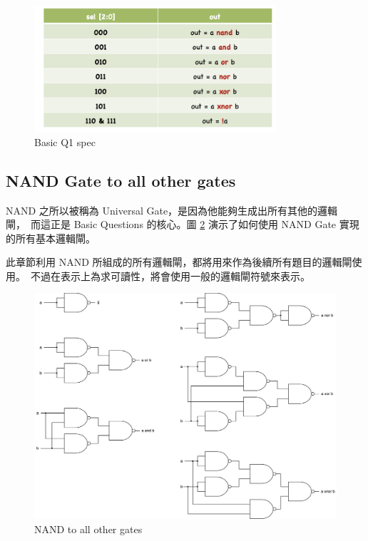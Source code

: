 \documentclass[10.5pt,compsoc,UTF8]{CjC}
\theoremstyle{mystyle}
\begin{document}
\begin{figure}[htp]
  \centering
  \includegraphics[width=0.8\textwidth]{Basic-Q1-spec.png}
  \caption{Basic Q1 spec}
  \label{fig:Basic Q1 spec}
\end{figure}
\subsection{NAND Gate to all other gates}

NAND 之所以被稱為 Universal Gate，是因為他能夠生成出所有其他的邏輯閘，\
而這正是 Basic Questions 的核心。圖 \ref{fig:NAND to all other gates} 演示了如何使用 NAND Gate 實現的所有基本邏輯閘。
\par
此章節利用 NAND 所組成的所有邏輯閘，都將用來作為後續所有題目的邏輯閘使用。\
不過在表示上為求可讀性，將會使用一般的邏輯閘符號來表示。

\begin{figure}[htp]
  \centering
  \includegraphics[width=\textwidth]{gates.png}
  \caption{NAND to all other gates}
  \label{fig:NAND to all other gates}
\end{figure}
\end{document}
